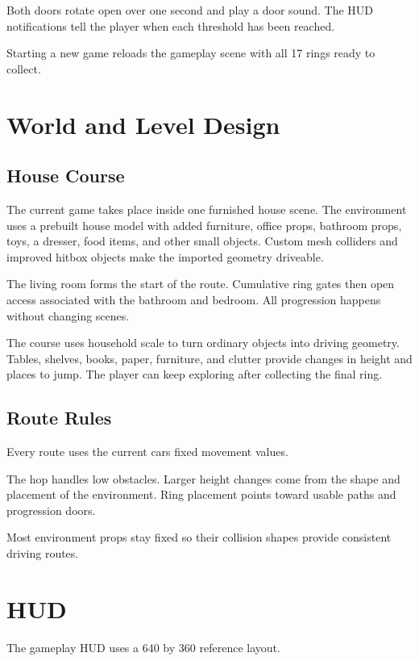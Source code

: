 \documentclass[11pt,a4paper]{article}
\begin{document}
Both doors rotate open over one second and play a door sound. The HUD notifications tell the player when each threshold has been reached.

Starting a new game reloads the gameplay scene with all 17 rings ready to collect.

\section{World and Level Design}\label{world-and-level-design}

\subsection{House Course}\label{house-course}

The current game takes place inside one furnished house scene. The environment uses a prebuilt house model with added furniture, office props, bathroom props, toys, a dresser, food items, and other small objects. Custom mesh colliders and improved hitbox objects make the imported geometry driveable.

The living room forms the start of the route. Cumulative ring gates then open access associated with the bathroom and bedroom. All progression happens without changing scenes.

The course uses household scale to turn ordinary objects into driving geometry. Tables, shelves, books, paper, furniture, and clutter provide changes in height and places to jump. The player can keep exploring after collecting the final ring.

\subsection{Route Rules}\label{route-rules}

Every route uses the current car\textquotesingle s fixed movement values.

The hop handles low obstacles. Larger height changes come from the shape and placement of the environment. Ring placement points toward usable paths and progression doors.

Most environment props stay fixed so their collision shapes provide consistent driving routes.

\section{HUD}\label{hud}

The gameplay HUD uses a 640 by 360 reference layout.
\end{document}
